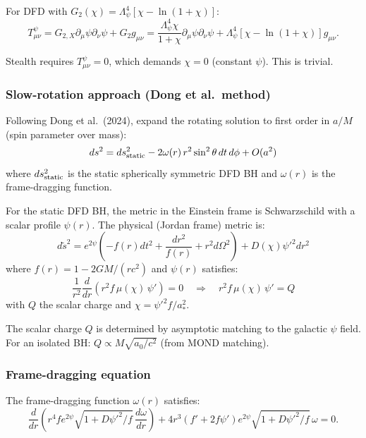 \documentclass[11pt,a4paper]{article}
\begin{document}
For DFD with $G_2(\chi) = \Lambda_\psi^4[\chi - \ln(1+\chi)]$:
\begin{equation}
T_{\mu\nu}^\psi = G_{2,X}\partial_\mu\psi\partial_\nu\psi + G_2 g_{\mu\nu} = \frac{\Lambda_\psi^4\chi}{1+\chi}\partial_\mu\psi\partial_\nu\psi + \Lambda_\psi^4[\chi-\ln(1+\chi)]g_{\mu\nu}.
\end{equation}

Stealth requires $T_{\mu\nu}^\psi = 0$, which demands $\chi = 0$ (constant $\psi$). This is trivial.

\subsubsection{Slow-rotation approach (Dong et al.\ method)}

Following Dong et al.\ (2024), expand the rotating solution to first order in $a/M$ (spin parameter over mass):
\begin{equation}
ds^2 = ds^2_{\rm static} - 2\omega(r)\,r^2\sin^2\theta\,dt\,d\phi + O(a^2)
\end{equation}
where $ds^2_{\rm static}$ is the static spherically symmetric DFD BH and $\omega(r)$ is the frame-dragging function.

For the static DFD BH, the metric in the Einstein frame is Schwarzschild with a scalar profile $\psi(r)$. The physical (Jordan frame) metric is:
\begin{equation}
d\tilde{s}^2 = e^{2\psi}\left(-f(r)dt^2 + \frac{dr^2}{f(r)} + r^2 d\Omega^2\right) + D(\chi)\psi'^2 dr^2
\end{equation}
where $f(r) = 1 - 2GM/(rc^2)$ and $\psi(r)$ satisfies:
\begin{equation}
\frac{1}{r^2}\frac{d}{dr}\left(r^2 f\,\mu(\chi)\,\psi'\right) = 0 \quad \Rightarrow \quad r^2 f\,\mu(\chi)\,\psi' = Q
\end{equation}
with $Q$ the scalar charge and $\chi = \psi'^2 f / a_*^2$.

The scalar charge $Q$ is determined by asymptotic matching to the galactic $\psi$ field. For an isolated BH: $Q \propto M\sqrt{a_0/c^2}$ (from MOND matching).

\subsubsection{Frame-dragging equation}

The frame-dragging function $\omega(r)$ satisfies:
\begin{equation}
\frac{d}{dr}\left(r^4 f e^{2\psi}\sqrt{1 + D\psi'^2/f}\,\frac{d\omega}{dr}\right) + 4r^3\left(f' + 2f\psi'\right)e^{2\psi}\sqrt{1 + D\psi'^2/f}\,\omega = 0.
\end{equation}
\end{document}
